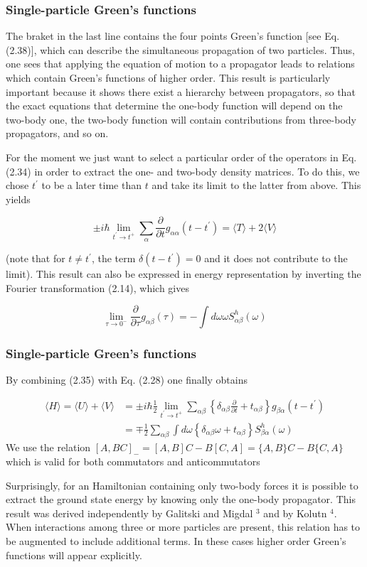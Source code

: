 \documentclass[compress]{beamer}
\begin{document}
\frame
{
\frametitle{Single-particle Green's functions}
\begin{small}
{\scriptsize
The braket in the last line contains the four points Green's function [see Eq. (2.38)], which can describe the simultaneous propagation of two particles. Thus, one sees that applying the equation of motion to a propagator leads to relations which contain Green's functions of higher order. This result is particularly important because it shows there exist a hierarchy between propagators, so that the exact equations that determine the one-body function will depend on the two-body one, the two-body function will contain contributions from three-body propagators, and so on.

For the moment we just want to select a particular order of the operators in Eq. (2.34) in order to extract the one- and two-body density matrices. To do this, we chose $t^{\prime}$ to be a later time than $t$ and take its limit to the latter from above. This yields

$$
\pm i \hbar \lim _{t^{\prime} \rightarrow t^{+}} \sum_{\alpha} \frac{\partial}{\partial t} g_{\alpha \alpha}\left(t-t^{\prime}\right)=\langle T\rangle+2\langle V\rangle
$$

(note that for $t \neq t^{\prime}$, the term $\delta\left(t-t^{\prime}\right)=0$ and it does not contribute to the limit). This result can also be expressed in energy representation by inverting the Fourier transformation (2.14), which gives

$$
\lim _{\tau \rightarrow 0^{-}} \frac{\partial}{\partial \tau} g_{\alpha \beta}(\tau)=-\int d \omega \omega S_{\alpha \beta}^{h}(\omega)
$$

}
\end{small}
}
\frame
{
\frametitle{Single-particle Green's functions}
\begin{small}
{\scriptsize
By combining (2.35) with Eq. (2.28) one finally obtains

$$
\begin{aligned}
\langle H\rangle=\langle U\rangle+\langle V\rangle & = \pm i \hbar \frac{1}{2} \lim _{t^{\prime} \rightarrow t^{+}} \sum_{\alpha \beta}\left\{\delta_{\alpha \beta} \frac{\partial}{\partial t}+t_{\alpha \beta}\right\} g_{\beta \alpha}\left(t-t^{\prime}\right) \\
& =\mp \frac{1}{2} \sum_{\alpha \beta} \int d \omega\left\{\delta_{\alpha \beta} \omega+t_{\alpha \beta}\right\} S_{\beta \alpha}^{h}(\omega)
\end{aligned}
$$
We use the relation $[A, B C]_{-}=[A, B] C-B[C, A]=\{A, B\} C-B\{C, A\}$ which is valid for both commutators and anticommutators


Surprisingly, for an Hamiltonian containing only two-body forces it is possible to extract the ground state energy by knowing only the one-body propagator. This result was derived independently by Galitski and Migdal ${ }^{3}$ and by Kolutn ${ }^{4}$. When interactions among three or more particles are present, this relation has to be augmented to include additional terms. In these cases higher order Green's functions will appear explicitly.

}
\end{small}
}
\end{document}
